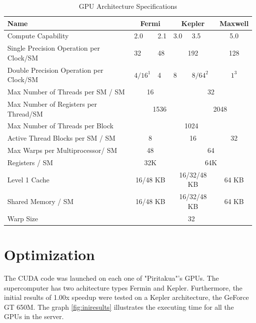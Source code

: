 \begin{table}[h]
\centering
  \begin{tabular} { | l | l  | l | l | l  |  l  | l |}
    \hline
    Name & \multicolumn{2}{|c|}{Fermi} & \multicolumn{2}{|c|}{Kepler} &  \multicolumn{2}{|c|}{Maxwell} \\
    \hline
    Compute Capability & 2.0 & 2.1 & 3.0 & 3.5 & \multicolumn{2}{|c|}{5.0}\\
   \hline
    Single Precision Operation per Clock/SM & 32 & 48 & \multicolumn{2}{|c|}{192} & \multicolumn{2}{|c|}{128}\\
   \hline
    Double Precision Operation per Clock/SM & $4/16^1$ & 4 & 8 & $8/64^2$ & \multicolumn{2}{|c|}{$1^3$}\\
   \hline
    Max Number of Threads per SM / SM & \multicolumn{2}{|c|}{16} & \multicolumn{4}{|c|}{32}\\
   \hline
    Max Number of Registers per Thread/SM & \multicolumn{3}{|c|}{1536} & \multicolumn{3}{|c|}{2048}\\
   \hline
       Max Number of Threads per Block & \multicolumn{6}{|c|}{1024}\\
   \hline
   Active Thread Blocks per SM / SM & \multicolumn{2}{|c|}{8} & \multicolumn{2}{|c|}{16} & \multicolumn{2}{|c|}{32}\\
   \hline
   Max Warps per Multiprocessor/ SM & \multicolumn{2}{|c|}{48} & \multicolumn{4}{|c|}{64}\\
   \hline
   Registers / SM & \multicolumn{2}{|c|}{32K} & \multicolumn{4}{|c|}{64K}\\
   \hline
   Level 1 Cache & \multicolumn{2}{|c|}{16/48 KB} & \multicolumn{2}{|c|}{16/32/48 KB} & \multicolumn{2}{|c|}{64 KB}\\
   \hline
   Shared Memory / SM & \multicolumn{2}{|c|}{16/48 KB} & \multicolumn{2}{|c|}{16/32/48 KB} & \multicolumn{2}{|c|}{64 KB}\\
   \hline
   Warp Size & \multicolumn{6}{c|}{32}  \\
   \hline
  \end{tabular}
  \caption{GPU Architecture Specifications}
  \label{tab:arch}
  \end{table}
 
\section{Optimization}

The CUDA code was launched on each one of "Piritakua"'s GPUs. The supercomputer has two  achitecture types Fermin and Kepler. Furthermore, the initial results of 1.00x speedup were tested on a Kepler architecture, the GeForce GT 650M. The graph \ref{fig:iniresults} illustrates the executing time for all the GPUs in the server.

